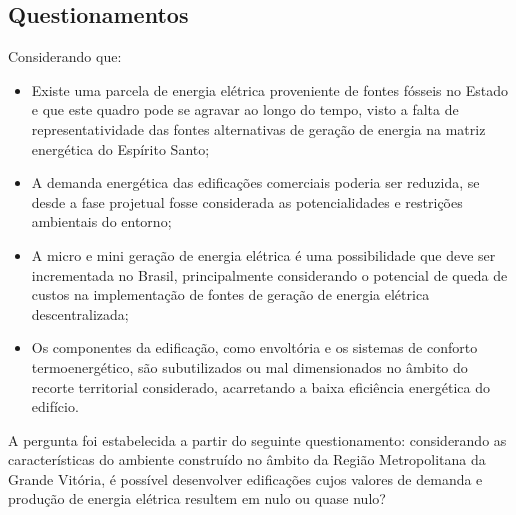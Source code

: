 \subsection{Questionamentos}
Considerando que:
\begin{itemize}
    \item Existe uma parcela de energia elétrica proveniente de fontes fósseis no 
    Estado e que este quadro pode se agravar ao longo do tempo, visto a falta de 
    representatividade das fontes alternativas de geração de energia na matriz 
    energética do Espírito Santo;
    \item A demanda energética das edificações comerciais poderia  ser reduzida,  se 
    desde a fase projetual fosse considerada as potencialidades e restrições 
    ambientais do entorno;
    \item A micro e mini geração de energia elétrica é uma possibilidade que deve ser 
    incrementada no Brasil, principalmente considerando o potencial de queda de custos 
    na implementação de fontes de geração de energia elétrica descentralizada;
    \item Os   componentes   da   edificação,   como   envoltória   e   os   sistemas   
    de   conforto termoenergético, são subutilizados ou mal dimensionados no âmbito do 
    recorte territorial considerado, acarretando a baixa eficiência energética do 
    edifício.
\end{itemize}
A pergunta foi estabelecida a partir do seguinte questionamento: 
considerando as características do  ambiente  construído  no  âmbito  da  Região  
Metropolitana  da  Grande  Vitória,  é  possível desenvolver edificações cujos valores 
de demanda e produção de energia elétrica resultem em nulo ou quase nulo?